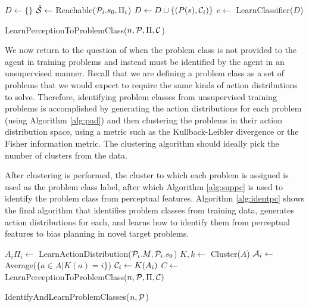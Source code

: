 \documentclass{article}
\begin{document}
\begin{algorithm}
\begin{algorithmic}
\State $D \gets \{\}$
\State $\hat{\cal S} \gets$ Reachable(${\cal P}_i.s_0, \Pi_i$)
\State $D \gets D \cup \{ (P(s), {\cal C}_i) \}$
\EndFor
\EndFor
\State $c \gets$ LearnClassifier($D$)
\State {} 
\end{algorithmic}
\caption{LearnPerceptionToProblemClass($n, {\cal P}, \Pi, {\cal C}$)}
\label{alg:suppc}
\end{algorithm}

We now return to the question of when the problem class is not provided to the agent in training problems and instead must be identified by the agent in an unsupervised manner. Recall that we are defining a problem class as a set of problems that we would expect to require the same kinds of action distributions to solve. Therefore, identifying problem classes from unsupervised training problems is accomplished by generating the action distributions for each problem (using Algorithm \ref{alg:pad}) and then clustering the problems in their action distribution space, using a metric such as the Kullback-Leibler divergence or the Fisher information metric. The clustering algorithm should ideally pick
the number of clusters from the data. 

After clustering is performed, the cluster to which each problem is assigned is used as the problem class label, after which Algorithm \ref{alg:suppc} is used to identify the problem class from perceptual features. Algorithm \ref{alg:identpc} shows the final algorithm that identifies problem classes from training data, generates action distributions for each, and learns how to identify them from perceptual features to bias planning in novel target problems.

\begin{algorithm}
\begin{algorithmic}
\State $A_i \Pi_i \gets$ LearnActionDistribution(${\cal P}_i.M, {\cal P}_i.s_0$)
\EndFor
\State $K,k \gets$ Cluster($A$) 
\State ${\cal A}_i \gets$ Average($\{a \in A | K(a) = i \}$) 
\EndFor
{}
\State ${\cal C}_i \gets K(A_i)$
\EndFor
\State $C \gets$ LearnPerceptionToProblemClass($n, {\cal P}, \Pi, {\cal C})$
\State {}
\end{algorithmic}
\caption{IdentifyAndLearnProblemClasses($n, {\cal P}$)}
\label{alg:identpc}
\end{algorithm}
\end{document}
